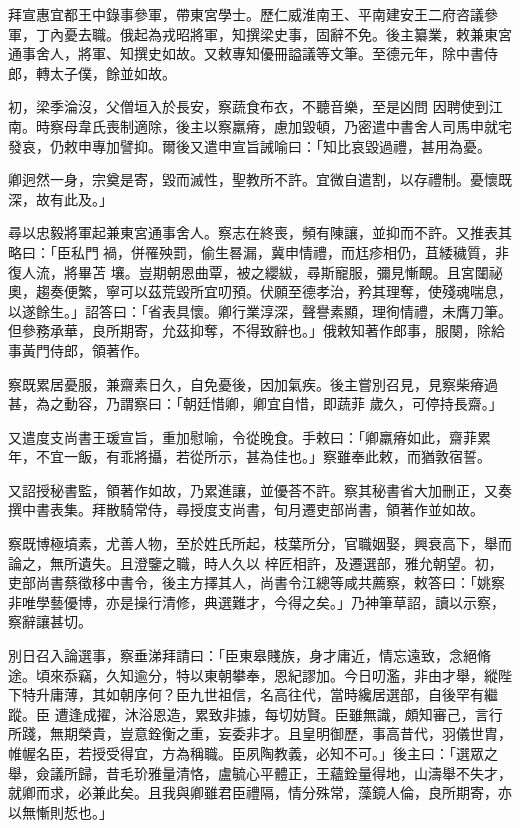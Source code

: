 \begin{pinyinscope}
 拜宣惠宜都王中錄事參軍，帶東宮學士。歷仁威淮南王、平南建安王二府咨議參軍，丁內憂去職。俄起為戎昭將軍，知撰梁史事，固辭不免。後主纂業，敕兼東宮通事舍人，將軍、知撰史如故。又敕專知優冊謚議等文筆。至德元年，除中書侍郎，轉太子僕，餘並如故。



 初，梁季淪沒，父僧垣入於長安，察蔬食布衣，不聽音樂，至是凶問
 因聘使到江南。時察母韋氏喪制適除，後主以察羸瘠，慮加毀頓，乃密遣中書舍人司馬申就宅發哀，仍敕申專加譬抑。爾後又遣申宣旨誡喻曰：「知比哀毀過禮，甚用為憂。



 卿迥然一身，宗奠是寄，毀而滅性，聖教所不許。宜微自遣割，以存禮制。憂懷既深，故有此及。」



 尋以忠毅將軍起兼東宮通事舍人。察志在終喪，頻有陳讓，並抑而不許。又推表其略曰：「臣私門禍，併罹殃罰，偷生晷漏，冀申情禮，而尪疹相仍，苴緌穢質，非復人流，將畢苫
 壤。豈期朝恩曲覃，被之纓紱，尋斯寵服，彌見慚靦。且宮闥祕奧，趨奏便繁，寧可以茲荒毀所宜叨預。伏願至德孝治，矜其理奪，使殘魂喘息，以遂餘生。」詔答曰：「省表具懷。卿行業淳深，聲譽素顯，理徇情禮，未膺刀筆。但參務承華，良所期寄，允茲抑奪，不得致辭也。」俄敕知著作郎事，服闋，除給事黃門侍郎，領著作。



 察既累居憂服，兼齋素日久，自免憂後，因加氣疾。後主嘗別召見，見察柴瘠過甚，為之動容，乃謂察曰：「朝廷惜卿，卿宜自惜，即蔬菲
 歲久，可停持長齋。」



 又遣度支尚書王瑗宣旨，重加慰喻，令從晚食。手敕曰：「卿羸瘠如此，齋菲累年，不宜一飯，有乖將攝，若從所示，甚為佳也。」察雖奉此敕，而猶敦宿誓。



 又詔授秘書監，領著作如故，乃累進讓，並優荅不許。察其秘書省大加刪正，又奏撰中書表集。拜散騎常侍，尋授度支尚書，旬月遷吏部尚書，領著作並如故。



 察既博極墳素，尤善人物，至於姓氏所起，枝葉所分，官職姻娶，興衰高下，舉而論之，無所遺失。且澄鑒之職，時人久以
 梓匠相許，及遷選部，雅允朝望。初，吏部尚書蔡徵移中書令，後主方擇其人，尚書令江總等咸共薦察，敕答曰：「姚察非唯學藝優博，亦是操行清修，典選難才，今得之矣。」乃神筆草詔，讀以示察，察辭讓甚切。



 別日召入論選事，察垂涕拜請曰：「臣東皋賤族，身才庸近，情忘遠致，念絕脩途。頃來忝竊，久知逾分，特以東朝攀奉，恩紀謬加。今日叨濫，非由才舉，縱陛下特升庸薄，其如朝序何？臣九世祖信，名高往代，當時纔居選部，自後罕有繼蹤。臣
 遭逢成擢，沐浴恩造，累致非據，每切妨賢。臣雖無識，頗知審己，言行所踐，無期榮貴，豈意銓衡之重，妄委非才。且皇明御歷，事高昔代，羽儀世胄，帷幄名臣，若授受得宜，方為稱職。臣夙陶教義，必知不可。」後主曰：「選眾之舉，僉議所歸，昔毛玠雅量清恪，盧毓心平體正，王蘊銓量得地，山濤舉不失才，就卿而求，必兼此矣。且我與卿雖君臣禮隔，情分殊常，藻鏡人倫，良所期寄，亦以無慚則悊也。」




\end{pinyinscope}
